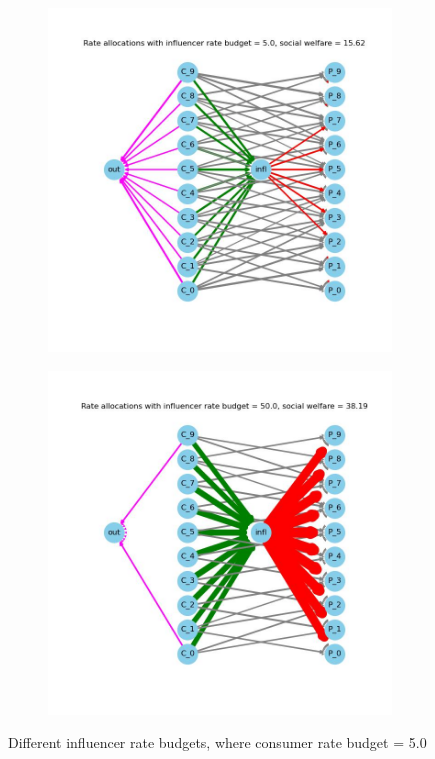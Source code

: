 \documentclass[11pt, letterpaper]{article}
\begin{document}
\begin{figure}[h]
\begin{adjustbox}{max width=1.5\textwidth,center}
\begin{subfigure}[b]{0.4\textwidth}
        \includegraphics[width=\linewidth]{"figures/M_INFL/5.0_allocs.jpg"}
    \end{subfigure}
    \begin{subfigure}[b]{0.4\textwidth}
        \includegraphics[width=\linewidth]{"figures/M_INFL/50.0_allocs.jpg"}
    \end{subfigure}
\end{adjustbox}
\caption{Different influencer rate budgets, where consumer rate budget = 5.0}
\label{fig:M_INFL}
\end{figure}
\end{document}
